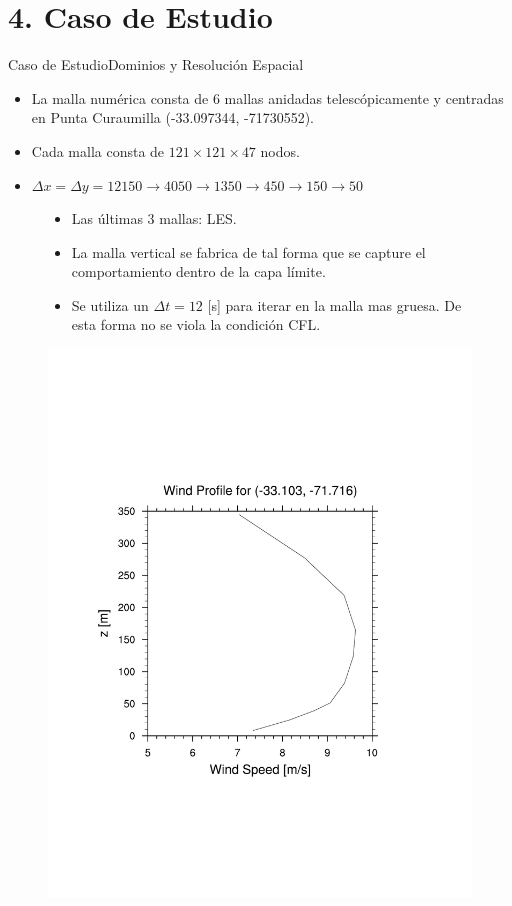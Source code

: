 \documentclass[mathserif]{beamer}
\begin{document}
\section{4. Caso de Estudio}
\begin{frame}{Caso de Estudio}{Dominios y Resolución Espacial}
	\begin{itemize}\justifying
		\item La malla numérica consta de 6 mallas anidadas telescópicamente y centradas en Punta Curaumilla (-33.097344, -71730552).
		\item Cada malla consta de $121\times121\times47$ nodos.
		\item $\Delta x=\Delta y =12150\rightarrow4050\rightarrow1350\rightarrow450\rightarrow150\rightarrow50$
	\end{itemize}
	\begin{figure}[H]
		\begin{minipage}{0.5\textwidth}
			\begin{itemize}\justifying\vspace{-12mm}
		\item Las últimas 3 mallas: LES.
		\item La malla vertical se fabrica de tal forma que se capture el comportamiento dentro de la capa límite.
		\item Se utiliza un $\Delta t = 12$ [s] para iterar en la malla mas gruesa. De esta forma no se viola la condición CFL.
	\end{itemize}
	\end{minipage}%
	\begin{minipage}{0.5\textwidth}
		\centering
		\includegraphics[width=\linewidth,page=9,trim={1cm 6cm 4cm 7.85cm},clip]{perfil_medio}

\end{minipage}
\end{figure}
\end{frame}
\end{document}
